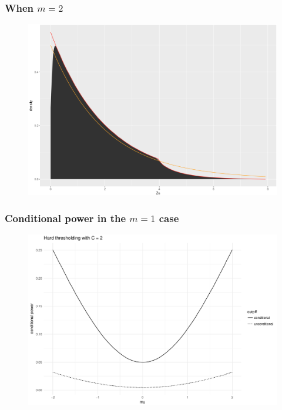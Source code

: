 \documentclass{beamer}
\begin{document}
\begin{frame}
\frametitle{When $m=2$}
\begin{figure}
\begin{center}
\includegraphics[scale=0.3]{m2.png}
\end{center}
\end{figure}
\end{frame}


\begin{frame}
\frametitle{Conditional power in the $m = 1$ case}

\begin{figure}
\begin{center}
\includegraphics[scale=0.45]{powerm1.pdf}
\end{center}
\end{figure}

\end{frame}
\end{document}
